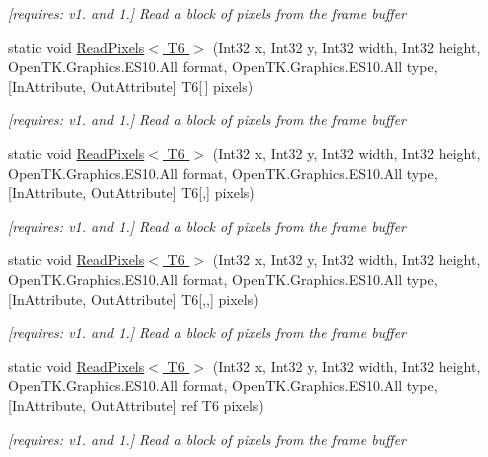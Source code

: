 \begin{DoxyCompactItemize}
\begin{DoxyCompactList}\small\item\em \mbox{[}requires\-: v1. and 1.\mbox{]} Read a block of pixels from the frame buffer \end{DoxyCompactList}\item 
static void \hyperlink{class_open_t_k_1_1_graphics_1_1_e_s10_1_1_g_l_af1802def8d2c69e5758b3a4bf9506615}{Read\-Pixels$<$ T6 $>$} (Int32 x, Int32 y, Int32 width, Int32 height, Open\-T\-K.\-Graphics.\-E\-S10.\-All format, Open\-T\-K.\-Graphics.\-E\-S10.\-All type, \mbox{[}In\-Attribute, Out\-Attribute\mbox{]} T6\mbox{[}$\,$\mbox{]} pixels)
\begin{DoxyCompactList}\small\item\em \mbox{[}requires\-: v1. and 1.\mbox{]} Read a block of pixels from the frame buffer \end{DoxyCompactList}\item 
static void \hyperlink{class_open_t_k_1_1_graphics_1_1_e_s10_1_1_g_l_a45415c2a39107298f9a53117b0815bfe}{Read\-Pixels$<$ T6 $>$} (Int32 x, Int32 y, Int32 width, Int32 height, Open\-T\-K.\-Graphics.\-E\-S10.\-All format, Open\-T\-K.\-Graphics.\-E\-S10.\-All type, \mbox{[}In\-Attribute, Out\-Attribute\mbox{]} T6\mbox{[},\mbox{]} pixels)
\begin{DoxyCompactList}\small\item\em \mbox{[}requires\-: v1. and 1.\mbox{]} Read a block of pixels from the frame buffer \end{DoxyCompactList}\item 
static void \hyperlink{class_open_t_k_1_1_graphics_1_1_e_s10_1_1_g_l_a78223744ecfd20e8bc2e9414d0a8ec31}{Read\-Pixels$<$ T6 $>$} (Int32 x, Int32 y, Int32 width, Int32 height, Open\-T\-K.\-Graphics.\-E\-S10.\-All format, Open\-T\-K.\-Graphics.\-E\-S10.\-All type, \mbox{[}In\-Attribute, Out\-Attribute\mbox{]} T6\mbox{[},,\mbox{]} pixels)
\begin{DoxyCompactList}\small\item\em \mbox{[}requires\-: v1. and 1.\mbox{]} Read a block of pixels from the frame buffer \end{DoxyCompactList}\item 
static void \hyperlink{class_open_t_k_1_1_graphics_1_1_e_s10_1_1_g_l_a6849ac46abba31a4bde6db4add80b32f}{Read\-Pixels$<$ T6 $>$} (Int32 x, Int32 y, Int32 width, Int32 height, Open\-T\-K.\-Graphics.\-E\-S10.\-All format, Open\-T\-K.\-Graphics.\-E\-S10.\-All type, \mbox{[}In\-Attribute, Out\-Attribute\mbox{]} ref T6 pixels)
\begin{DoxyCompactList}\small\item\em \mbox{[}requires\-: v1. and 1.\mbox{]} Read a block of pixels from the frame buffer \end{DoxyCompactList}\item 

\end{DoxyCompactItemize}
